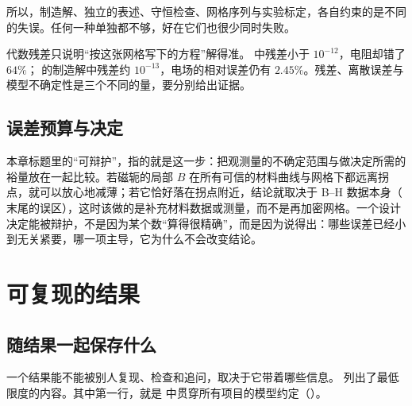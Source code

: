 所以，制造解、独立的表述、守恒检查、网格序列与实验标定，各自约束的是不同的失误。任何一种单独都不够，好在它们也很少同时失败。

\begin{pitfall}
代数残差只说明“按这张网格写下的方程”解得准。 中残差小于 $10^{-12}$，电阻却错了 $64\%$； 的制造解中残差约 $10^{-13}$，电场的相对误差仍有 $2.45\%$。残差、离散误差与模型不确定性是三个不同的量，要分别给出证据。
\end{pitfall}

\subsection{误差预算与决定}
本章标题里的“可辩护”，指的就是这一步：把观测量的不确定范围与做决定所需的裕量放在一起比较。若磁轭的局部 $B$ 在所有可信的材料曲线与网格下都远离拐点，就可以放心地减薄；若它恰好落在拐点附近，结论就取决于 B--H 数据本身（ 末尾的误区），这时该做的是补充材料数据或测量，而不是再加密网格。一个设计决定能被辩护，不是因为某个数“算得很精确”，而是因为说得出：哪些误差已经小到无关紧要，哪一项主导，它为什么不会改变结论。

\section{可复现的结果}\label{sec:practice-reproducible}

\subsection{随结果一起保存什么}
一个结果能不能被别人复现、检查和追问，取决于它带着哪些信息。 列出了最低限度的内容。其中第一行，就是 中贯穿所有项目的模型约定（）。

